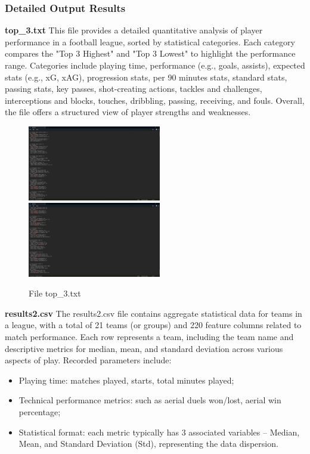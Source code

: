 \documentclass[12pt]{report}
\begin{document}
{{\subsubsection{Detailed Output Results} %
\textbf{top\_3.txt} %
This file provides a detailed quantitative analysis of player performance in a football league, sorted by statistical categories. Each category compares the "Top 3 Highest" and "Top 3 Lowest" to highlight the performance range. Categories include playing time, performance (e.g., goals, assists), expected stats (e.g., xG, xAG), progression stats, per 90 minutes stats, standard stats, passing stats, key passes, shot-creating actions, tackles and challenges, interceptions and blocks, touches, dribbling, passing, receiving, and fouls. Overall, the file offers a structured view of player strengths and weaknesses.
\begin{figure}[h]
    \centering
    \includegraphics[width=220px]{top_3.png}
    \includegraphics[width=220px]{top_3_1.png}
    \caption{File top\_3.txt} %
    \label{fig:top3}
\end{figure}
\textbf{results2.csv} %
The results2.csv file contains aggregate statistical data for teams in a league, with a total of 21 teams (or groups) and 220 feature columns related to match performance. Each row represents a team, including the team name and descriptive metrics for median, mean, and standard deviation across various aspects of play.
Recorded parameters include:
\begin{itemize}
	\item Playing time: matches played, starts, total minutes played;
	\item Technical performance metrics: such as aerial duels won/lost, aerial win percentage;
	\item Statistical format: each metric typically has 3 associated variables – Median, Mean, and Standard Deviation (Std), representing the data dispersion.

\end{itemize}}}
\end{document}
